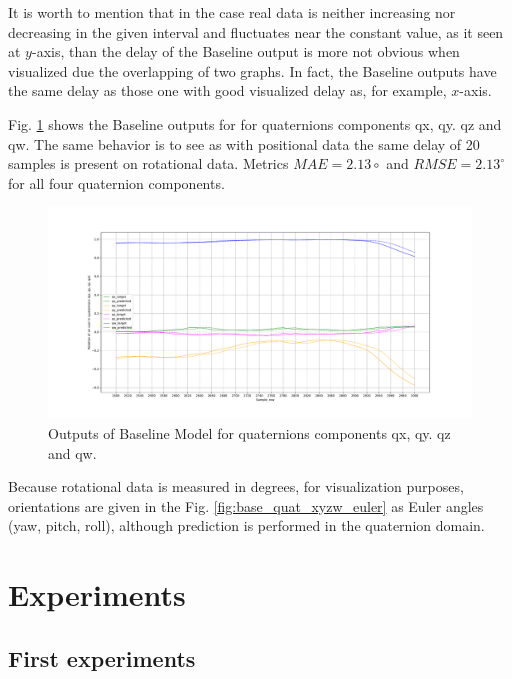 It is worth to mention that in the case real data is neither increasing nor decreasing in the given interval and fluctuates near the constant value, as it seen at $y$-axis, than the delay of the Baseline output is more not obvious when visualized due the overlapping of two graphs. In fact, the Baseline outputs have the same delay as those one with good visualized delay as, for example, $x$-axis.

Fig. \ref{fig:base_quat_xyzw} shows the Baseline outputs for for quaternions components qx, qy. qz and qw. The same behavior is to see as with positional data the same delay of 20 samples is present on rotational data. Metrics $MAE = 2.13{\circ}$ and $RMSE =2.13^{\circ}$ for all four quaternion components.  

\begin{figure}[htb]
	\begin{center}
		\includegraphics[width=1\textwidth, keepaspectratio]{gfx/base_zoom-qx_qy_qz_qw_rotation.pdf}
		\caption{\label{fig:base_quat_xyzw} Outputs of Baseline Model for quaternions components qx, qy. qz and qw.}
	\end{center}
\end{figure}

Because rotational data is measured in degrees, for visualization purposes, orientations are given in the Fig. \ref{fig:base_quat_xyzw_euler} as Euler angles (yaw, pitch, roll), although prediction is performed in the quaternion domain.

\section{Experiments}
\label{sec:eval:experiments}

\subsection{First experiments}
\label{sec:eval:experiments:early}

